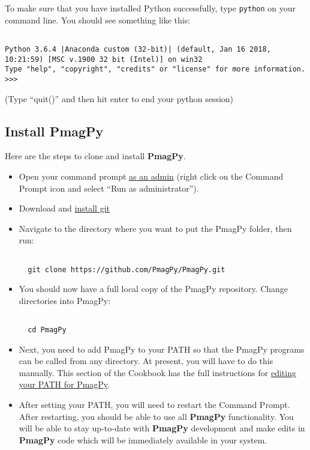 \documentclass[11pt]{article}
\begin{document}
To make sure that you have installed Python successfully, type \texttt{python} on your command line.  You should see something like this: \begin{verbatim}

Python 3.6.4 |Anaconda custom (32-bit)| (default, Jan 16 2018, 10:21:59) [MSC v.1900 32 bit (Intel)] on win32
Type "help", "copyright", "credits" or "license" for more information.
>>>\end{verbatim}
(Type ``quit()'' and then hit enter to end your python session)



\subsection{Install PmagPy}

Here are the steps to clone and install {\bf PmagPy}.

\begin{itemize}

\item Open your command prompt \href{http://www.thewindowsclub.com/how-to-run-command-prompt-as-an-administrator}{as an admin} (right click on the Command Prompt icon and select ``Run as administrator'').

\item Download and \href{https://git-scm.com/downloads}{install git}

  \item Navigate to the directory where you want to put the PmagPy folder, then run:

\begin{verbatim}

  git clone https://github.com/PmagPy/PmagPy.git
\end{verbatim}

\item You should now have a full local copy of the PmagPy repository.  Change directories into PmagPy:

\begin{verbatim}

  cd PmagPy
\end{verbatim}


\item Next, you need to add PmagPy to your PATH so that the PmagPy programs can be called from any directory.  At present, you will have to do this manually.  This section of the Cookbook has the full instructions for \href{https://earthref.org/PmagPy/cookbook/#setting_path}{editing your PATH for PmagPy}.

\item After setting your PATH, you will need to restart the Command Prompt.  After restarting, you should be able to use all {\bf PmagPy} functionality.  You will be able to stay up-to-date with {\bf PmagPy} development and make edits in {\bf PmagPy} code which will be immediately available in your system.

\end{itemize}
\end{document}
